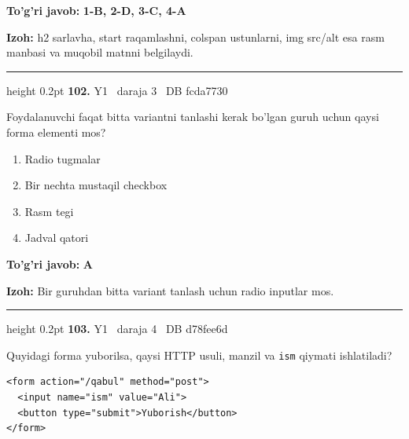\documentclass[10pt,a4paper,oneside]{article}
\begin{document}
\begin{tcolorbox}[enhanced,breakable,colback=teal!4,colframe=teal!45!black,boxrule=0.45pt,arc=1.2mm,left=2.8mm,right=2.8mm,top=2mm,bottom=2mm,before skip=2mm,after skip=2mm]
\textbf{\color{teal}To'g'ri javob:} \textbf{1-B, 2-D, 3-C, 4-A}
\par\smallskip
\textbf{Izoh:} h2 sarlavha, start raqamlashni, colspan ustunlarni, img src/alt esa rasm manbasi va muqobil matnni belgilaydi.
\end{tcolorbox}
\vspace{2mm}\hrule height 0.2pt \vspace{4mm}
\hypertarget{q102}{\textbf{\color{ink}102.}}  {\color{muted}\scriptsize Y1 \textbullet\ daraja 3 \textbullet\ DB fcda7730}
\par
Foydalanuvchi faqat bitta variantni tanlashi kerak bo'lgan guruh uchun qaysi forma elementi mos?
\begin{enumerate}[label=\Alph*),leftmargin=9mm]
\item Radio tugmalar
\item Bir nechta mustaqil checkbox
\item Rasm tegi
\item Jadval qatori
\end{enumerate}
\begin{tcolorbox}[enhanced,breakable,colback=teal!4,colframe=teal!45!black,boxrule=0.45pt,arc=1.2mm,left=2.8mm,right=2.8mm,top=2mm,bottom=2mm,before skip=2mm,after skip=2mm]
\textbf{\color{teal}To'g'ri javob:} \textbf{A}
\par\smallskip
\textbf{Izoh:} Bir guruhdan bitta variant tanlash uchun radio inputlar mos.
\end{tcolorbox}
\vspace{2mm}\hrule height 0.2pt \vspace{4mm}
\hypertarget{q103}{\textbf{\color{ink}103.}}  {\color{muted}\scriptsize Y1 \textbullet\ daraja 4 \textbullet\ DB d78fee6d}
\par
Quyidagi forma yuborilsa, qaysi HTTP usuli, manzil va \texttt{ism} qiymati ishlatiladi?\par
\begin{lstlisting}
<form action="/qabul" method="post">
  <input name="ism" value="Ali">
  <button type="submit">Yuborish</button>
</form>
\end{lstlisting}
\end{document}
